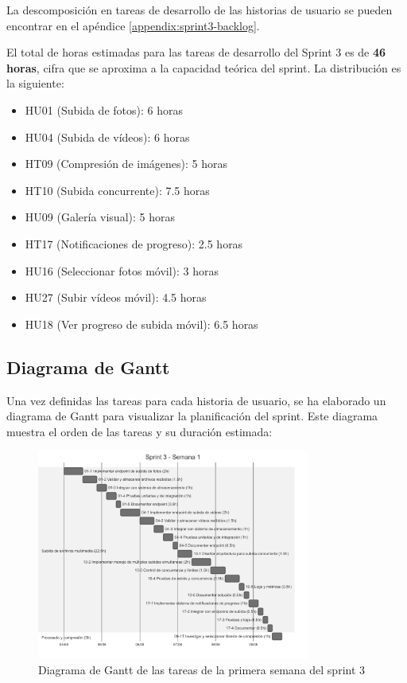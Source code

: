 La descomposición en tareas de desarrollo de las historias de usuario se pueden encontrar en el apéndice \ref{appendix:sprint3-backlog}.

El total de horas estimadas para las tareas de desarrollo del Sprint 3 es de \textbf{46 horas}, cifra que se aproxima a la capacidad teórica del sprint. La distribución es la siguiente:

\begin{itemize}
    \item HU01 (Subida de fotos): 6 horas
    \item HU04 (Subida de vídeos): 6 horas
    \item HT09 (Compresión de imágenes): 5 horas
    \item HT10 (Subida concurrente): 7.5 horas
    \item HU09 (Galería visual): 5 horas
    \item HT17 (Notificaciones de progreso): 2.5 horas
    \item HU16 (Seleccionar fotos móvil): 3 horas
    \item HU27 (Subir vídeos móvil): 4.5 horas
    \item HU18 (Ver progreso de subida móvil): 6.5 horas
\end{itemize}

\subsection{Diagrama de Gantt}
Una vez definidas las tareas para cada historia de usuario, se ha elaborado un diagrama de Gantt para visualizar la planificación del sprint. Este diagrama muestra el orden de las tareas y su duración estimada:

\begin{figure}[H]
    \begin{center}
        \includegraphics[width=0.8\textwidth]{assets/sprint3/week1-gantt.png}
    \end{center}
    \caption{Diagrama de Gantt de las tareas de la primera semana del sprint 3}\label{fig:gantt-sprint3-week1}
\end{figure}


